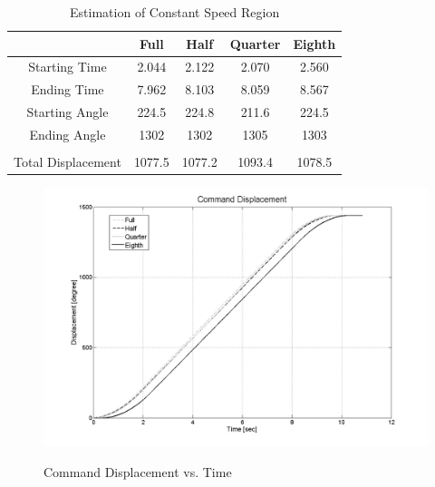 \documentclass{article}
\theoremstyle{plain}
\theoremstyle{definition}
\theoremstyle{remark}
\begin{document}
\begin{table}[ht]
\caption{Estimation of Constant Speed Region} %
\centering  %
\begin{tabular}{c c c c c}\\ %
\hline                        %

 & Full & Half & Quarter & Eighth\\ [0.5ex] %
\hline                  %
Starting Time & 2.044 & 2.122 & 2.070 & 2.560 \\ %
Ending Time & 7.962 & 8.103 & 8.059 & 8.567 \\
Starting Angle & 224.5 & 224.8 & 211.6 & 224.5 \\
Ending Angle & 1302 & 1302 & 1305 & 1303 \\
\hline \\%
Total Displacement & 1077.5 & 1077.2 & 1093.4 & 1078.5\\[1ex]      %

\hline %
\end{tabular}
\label{table:Q4_1} %
\end{table}

\begin{figure}[hbt]
\begin{center}
\includegraphics[width=12cm]{Q4_CommandPosition.png}
\caption{Command Displacement vs. Time} \label{tex}
\label{fig:q4_7}
\end{center}
\end{figure}
\end{document}
